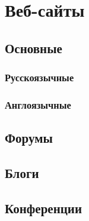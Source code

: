 \section{Веб-сайты}\label{common-lisp:infosources:web}
\subsection{Основные}\label{common-lisp:infosources:web:main}
\subsubsection{Русскоязычные}\label{common-lisp:infosources:web:main:rus}
\subsubsection{Англоязычные}\label{common-lisp:infosources:web:main:eng}
\subsection{Форумы}\label{common-lisp:infosources:web:forums}
\subsection{Блоги}\label{common-lisp:infosources:web:blogs}
\subsection{Конференции}\label{common-lisp:infosources:web:conferences}
